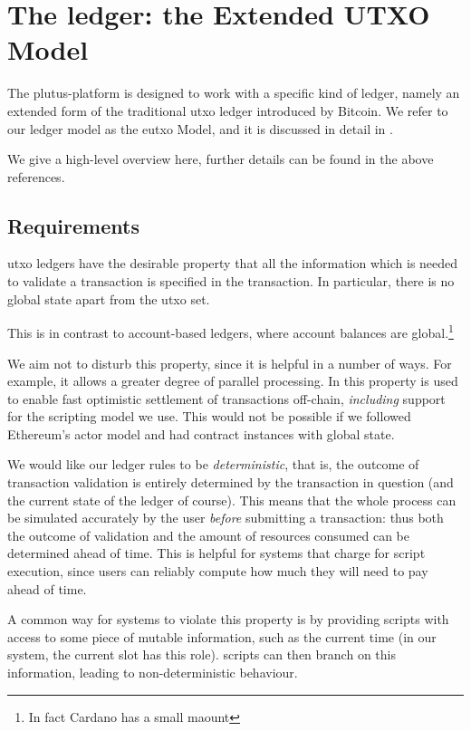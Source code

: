 \section{The ledger: the Extended UTXO Model}
\label{sec:ledger}

The \gls{plutus-platform} is designed to work with a specific kind of ledger, namely an extended form of the traditional \gls{utxo} ledger introduced by Bitcoin.
We refer to our ledger model as the \gls{eutxo} Model, and it is discussed in detail in \textcite{eutxo,utxoma,eutxoma}.

We give a high-level overview here, further details can be found in the above references.

\subsection{Requirements}
\begin{requirement}[Locality]
\label{req:ledger-locality}
\Gls{utxo} ledgers have the desirable property that all the information which is needed to validate a transaction is specified in the transaction.
In particular, there is no global state apart from the \gls{utxo} set.

This is in contrast to account-based ledgers, where account balances are global.\footnote{
  In fact Cardano has a small maount
}

We aim not to disturb this property, since it is helpful in a number of ways.
For example, it allows a greater degree of parallel processing.
In \textcite{chakravartyhydra} this property is used to enable fast optimistic settlement of transactions off-chain, \emph{including} support for the scripting model we use.
This would not be possible if we followed Ethereum's actor model and had contract instances with global state.
\end{requirement}

\begin{requirement}[Determinism]
\label{req:ledger-determinism}
We would like our ledger rules to be \emph{deterministic}, that is, the outcome of transaction validation is entirely determined by the transaction in question (and the current state of the ledger of course).
This means that the whole process can be simulated accurately by the user \emph{before} submitting a transaction: thus both the outcome of validation and the amount of resources consumed can be determined ahead of time.
This is helpful for systems that charge for \gls{script} execution, since users can reliably compute how much they will need to pay ahead of time.

A common way for systems to violate this property is by providing \glspl{script} with access to some piece of mutable information, such as the current time (in our system, the current slot has this role).
\Glspl{script} can then branch on this information, leading to non-deterministic behaviour.
\end{requirement}

